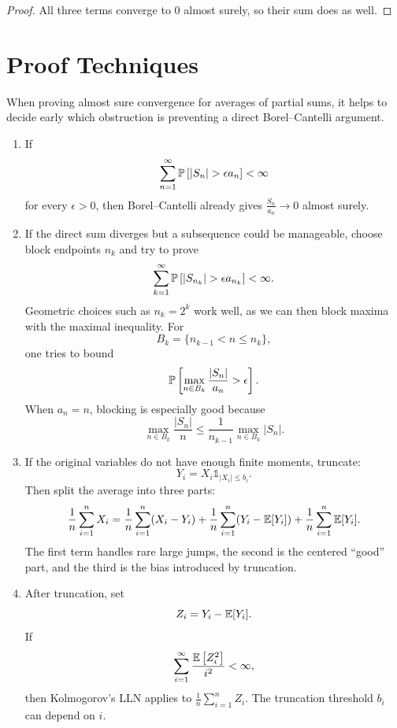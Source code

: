 \begin{proof}
	All three terms converge to $0$ almost surely, so their sum does as well.
\end{proof}

\section{Proof Techniques}

When proving almost sure convergence for averages of partial sums, it helps to decide early which obstruction is preventing a direct Borel--Cantelli argument.

\begin{enumerate}
	\item If
	\[
		\sum\limits_{n=1}^{\infty} \P\left[\left| S_n \right| > \epsilon a_n\right] < \infty
	\]
	for every $\epsilon > 0$, then Borel--Cantelli already gives $\frac{S_n}{a_n} \to 0$ almost surely.

	\item If the direct sum diverges but a subsequence could be manageable, choose block endpoints $n_k$ and try to prove
	\[
		\sum\limits_{k=1}^{\infty} \P\left[\left| S_{n_k} \right| > \epsilon a_{n_k}\right] < \infty.
	\]
	Geometric choices such as $n_k = 2^k$ work well, as we can then block maxima with the maximal inequality. For
	\[
		B_k = \{n_{k-1} < n \le n_k\},
	\]
	one tries to bound
	\[
		\P\left[\max_{n \in B_k} \frac{\left| S_n \right|}{a_n} > \epsilon\right].
	\]
	When $a_n = n$, blocking is especially good because
	\[
		\max_{n \in B_k} \frac{\left| S_n \right|}{n}
		\le \frac{1}{n_{k-1}} \max_{n \in B_k} \left| S_n \right|.
	\]

	\item If the original variables do not have enough finite moments, truncate:
	\[
		Y_i = X_i \mathds{1}_{\left| X_i \right| \le b_i}.
	\]
	Then split the average into three parts:
	\[
		\frac{1}{n} \sum\limits_{i=1}^{n} X_i
		= \frac{1}{n} \sum\limits_{i=1}^{n} (X_i-Y_i)
		+ \frac{1}{n} \sum\limits_{i=1}^{n} (Y_i-\E[Y_i])
		+ \frac{1}{n} \sum\limits_{i=1}^{n} \E[Y_i].
	\]
	The first term handles rare large jumps, the second is the centered ``good'' part, and the third is the bias introduced by truncation.

	\item After truncation, set
	\[
		Z_i = Y_i - \E[Y_i].
	\]
	If
	\[
		\sum\limits_{i=1}^{\infty} \frac{\E\left[Z_i^2\right]}{i^2} < \infty,
	\]
	then Kolmogorov's LLN applies to $\frac{1}{n}\sum_{i=1}^{n} Z_i$. The truncation threshold $b_i$ can depend on $i$.
\end{enumerate}
